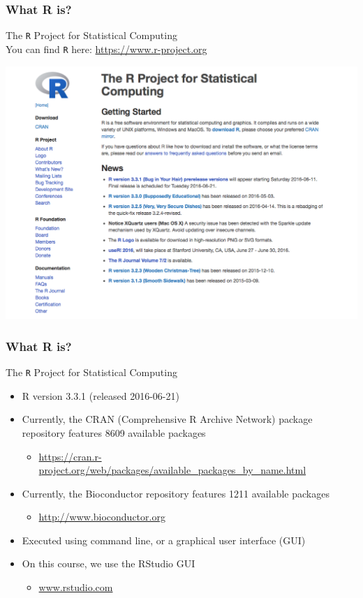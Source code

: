 \documentclass{beamer}
\begin{document}
\begin{frame}
	\frametitle{What R is?}
        \Large The \texttt{R} Project for Statistical Computing\\
	\small You can find \texttt{R} here:
	\url{https://www.r-project.org}\\
	\begin{center} \includegraphics[scale=0.25]{figures/R-project.png} \end{center}
\end{frame}

\begin{frame}
	\frametitle{What R is?}
        \Large The \texttt{R} Project for Statistical Computing\\
	\begin{itemize}
		\small
		\item R version 3.3.1 (released 2016-06-21)
		\item Currently, the CRAN {\tiny(Comprehensive R Archive Network)} package repository features 8609 available packages
			\begin{itemize}
				\item \tiny \url{https://cran.r-project.org/web/packages/available_packages_by_name.html}
			\end{itemize}
		\item Currently, the Bioconductor repository features 1211 available packages
			\begin{itemize}
				\item \tiny \url{http://www.bioconductor.org}
			\end{itemize}
		\item Executed using command line, or a graphical user interface (GUI)
		\item On this course, we use the RStudio GUI
			\begin{itemize}
				\item \tiny \url{www.rstudio.com}
			\end{itemize}
	\end{itemize}
\end{frame}
\end{document}
